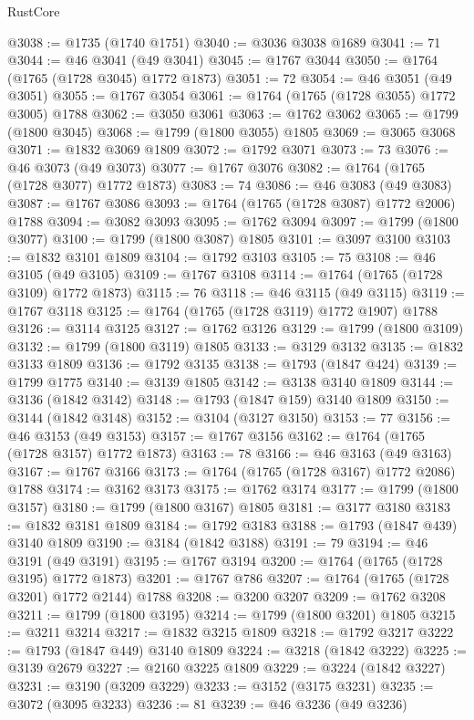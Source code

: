 \begin{lexlean}{RustCore}
\begin{coremodule}
@3038 := @1735 (@1740 @1751)
@3040 := @3036 @3038 @1689
@3041 := 71
@3044 := @46 @3041 (@49 @3041)
@3045 := @1767 @3044
@3050 := @1764 (@1765 (@1728 @3045) @1772 @1873)
@3051 := 72
@3054 := @46 @3051 (@49 @3051)
@3055 := @1767 @3054
@3061 := @1764 (@1765 (@1728 @3055) @1772 @3005) @1788
@3062 := @3050 @3061
@3063 := @1762 @3062
@3065 := @1799 (@1800 @3045)
@3068 := @1799 (@1800 @3055) @1805
@3069 := @3065 @3068
@3071 := @1832 @3069 @1809
@3072 := @1792 @3071
@3073 := 73
@3076 := @46 @3073 (@49 @3073)
@3077 := @1767 @3076
@3082 := @1764 (@1765 (@1728 @3077) @1772 @1873)
@3083 := 74
@3086 := @46 @3083 (@49 @3083)
@3087 := @1767 @3086
@3093 := @1764 (@1765 (@1728 @3087) @1772 @2006) @1788
@3094 := @3082 @3093
@3095 := @1762 @3094
@3097 := @1799 (@1800 @3077)
@3100 := @1799 (@1800 @3087) @1805
@3101 := @3097 @3100
@3103 := @1832 @3101 @1809
@3104 := @1792 @3103
@3105 := 75
@3108 := @46 @3105 (@49 @3105)
@3109 := @1767 @3108
@3114 := @1764 (@1765 (@1728 @3109) @1772 @1873)
@3115 := 76
@3118 := @46 @3115 (@49 @3115)
@3119 := @1767 @3118
@3125 := @1764 (@1765 (@1728 @3119) @1772 @1907) @1788
@3126 := @3114 @3125
@3127 := @1762 @3126
@3129 := @1799 (@1800 @3109)
@3132 := @1799 (@1800 @3119) @1805
@3133 := @3129 @3132
@3135 := @1832 @3133 @1809
@3136 := @1792 @3135
@3138 := @1793 (@1847 @424)
@3139 := @1799 @1775
@3140 := @3139 @1805
@3142 := @3138 @3140 @1809
@3144 := @3136 (@1842 @3142)
@3148 := @1793 (@1847 @159) @3140 @1809
@3150 := @3144 (@1842 @3148)
@3152 := @3104 (@3127 @3150)
@3153 := 77
@3156 := @46 @3153 (@49 @3153)
@3157 := @1767 @3156
@3162 := @1764 (@1765 (@1728 @3157) @1772 @1873)
@3163 := 78
@3166 := @46 @3163 (@49 @3163)
@3167 := @1767 @3166
@3173 := @1764 (@1765 (@1728 @3167) @1772 @2086) @1788
@3174 := @3162 @3173
@3175 := @1762 @3174
@3177 := @1799 (@1800 @3157)
@3180 := @1799 (@1800 @3167) @1805
@3181 := @3177 @3180
@3183 := @1832 @3181 @1809
@3184 := @1792 @3183
@3188 := @1793 (@1847 @439) @3140 @1809
@3190 := @3184 (@1842 @3188)
@3191 := 79
@3194 := @46 @3191 (@49 @3191)
@3195 := @1767 @3194
@3200 := @1764 (@1765 (@1728 @3195) @1772 @1873)
@3201 := @1767 @786
@3207 := @1764 (@1765 (@1728 @3201) @1772 @2144) @1788
@3208 := @3200 @3207
@3209 := @1762 @3208
@3211 := @1799 (@1800 @3195)
@3214 := @1799 (@1800 @3201) @1805
@3215 := @3211 @3214
@3217 := @1832 @3215 @1809
@3218 := @1792 @3217
@3222 := @1793 (@1847 @449) @3140 @1809
@3224 := @3218 (@1842 @3222)
@3225 := @3139 @2679
@3227 := @2160 @3225 @1809
@3229 := @3224 (@1842 @3227)
@3231 := @3190 (@3209 @3229)
@3233 := @3152 (@3175 @3231)
@3235 := @3072 (@3095 @3233)
@3236 := 81
@3239 := @46 @3236 (@49 @3236)

\end{coremodule}
\end{lexlean}
